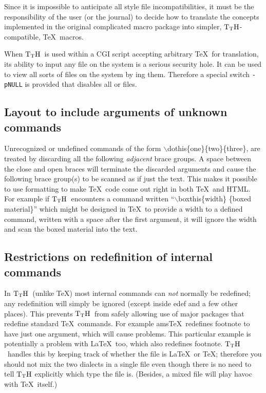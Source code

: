 \documentclass[12pt]{article}
\def\TtH{$\rm{}T_TH$}
\begin{document}
Since it is impossible to anticipate all style file incompatibilities,
it must be the responsibility of the user (or the journal) to decide
how to translate the concepts implemented in the original complicated
macro package into simpler, \TtH-compatible, \TeX\ macros.

When \TtH\ is used within a CGI script accepting arbitrary \TeX\ for
translation, its ability to input any file on the system is a serious
security hole. It can be used to view all sorts of files on the system
by \verb!!ing them. Therefore a special switch \verb!-pNULL! is
provided that disables all \verb!! or \verb!! files.

\subsection{Layout to include arguments of unknown
commands
}

Unrecognized or undefined commands of the form
$\backslash$dothis\{one\}\{two\}\{three\}, are treated by discarding
all the following {\it adjacent} brace groups. A space between the close and
open braces will terminate the discarded arguments and cause the
following brace group(s) to be scanned as if just the text. This
makes it possible to use formatting to make \TeX\ code come out right in
both \TeX\ and HTML. For example if \TtH\ encounters a command written
``$\backslash$boxthis\{width\} \{boxed material\}'' which might be
designed in \TeX\ to provide a width to a defined command, written with
a space after the first argument, it will ignore the width and scan
the boxed material into the text.

\subsection{Restrictions on redefinition of internal
commands
}

In \TtH\ (unlike \TeX) most internal commands can {\it not} normally be
redefined; any redefinition will simply be ignored (except inside edef
and a few other places). This prevents \TtH\ from safely allowing use of
major packages that redefine standard \TeX\ commands. For example ams\TeX\
redefines footnote to have just one argument, which will cause
problems. This particular example is potentially a problem with \LaTeX\
too, which also redefines footnote. \TtH\ handles this by keeping track
of whether the file is \LaTeX\ or \TeX; therefore you should not mix the
two dialects in a single file even though there is no need to tell \TtH
explicitly which type the file is. (Besides, a mixed file will play
havoc with \TeX\ itself.)
 
\end{document}

